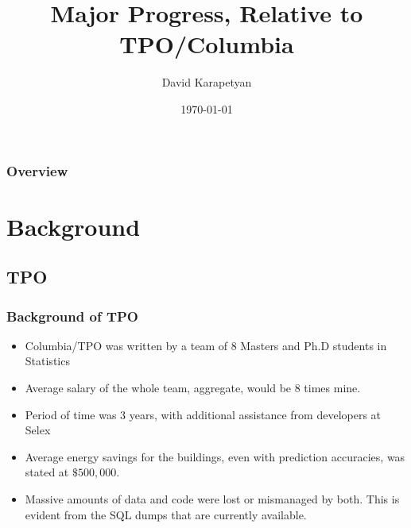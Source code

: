 \documentclass{beamer}
\title[Major Progress]{Major Progress, Relative to TPO/Columbia} %
\author{David Karapetyan} %
\institute[PrescriptiveData] %
{
PrescriptiveData \\ %
\medskip
\textit{dkarapetyan@prescriptivedata.io} %
}
\date{\today} %
\begin{document}
\begin{frame}
\titlepage %
\end{frame}

\begin{frame}
\frametitle{Overview} %
\tableofcontents %
\end{frame}


\section{Background} %

\subsection{TPO}
\begin{frame}
\frametitle{Background of TPO}
\begin{itemize}
	\item Columbia/TPO was written by a team of 8 Masters and Ph.D students in Statistics
	\item Average salary of the whole team, aggregate, would be $8$ times mine. 
	\item Period of time was 3 years, with additional assistance from developers at Selex
	\item Average energy savings for the buildings, even with prediction accuracies, was stated at $\$500,000$.
	\item Massive amounts of data and code were lost or mismanaged by both. This is evident
		from the SQL dumps that are currently available.
\end{itemize}
\end{frame}
\end{document}
